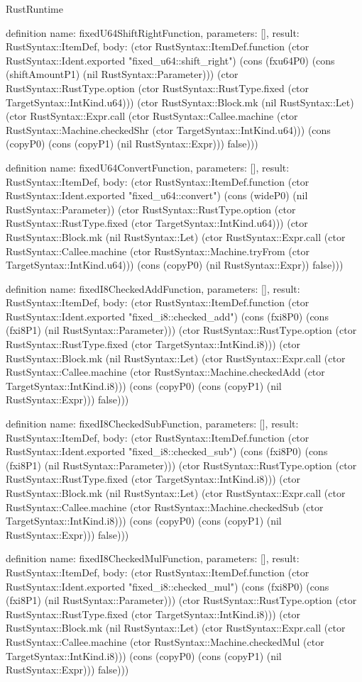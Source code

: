 \begin{lexlean}{RustRuntime}
\begin{semanticmodule}
definition{
  name: fixedU64ShiftRightFunction,
  parameters: [],
  result: RustSyntax::ItemDef,
  body: (ctor RustSyntax::ItemDef.function (ctor RustSyntax::Ident.exported "fixed_u64::shift_right") (cons (fxu64P0) (cons (shiftAmountP1) (nil RustSyntax::Parameter))) (ctor RustSyntax::RustType.option (ctor RustSyntax::RustType.fixed (ctor TargetSyntax::IntKind.u64))) (ctor RustSyntax::Block.mk (nil RustSyntax::Let) (ctor RustSyntax::Expr.call (ctor RustSyntax::Callee.machine (ctor RustSyntax::Machine.checkedShr (ctor TargetSyntax::IntKind.u64))) (cons (copyP0) (cons (copyP1) (nil RustSyntax::Expr))) false)))
}

definition{
  name: fixedU64ConvertFunction,
  parameters: [],
  result: RustSyntax::ItemDef,
  body: (ctor RustSyntax::ItemDef.function (ctor RustSyntax::Ident.exported "fixed_u64::convert") (cons (wideP0) (nil RustSyntax::Parameter)) (ctor RustSyntax::RustType.option (ctor RustSyntax::RustType.fixed (ctor TargetSyntax::IntKind.u64))) (ctor RustSyntax::Block.mk (nil RustSyntax::Let) (ctor RustSyntax::Expr.call (ctor RustSyntax::Callee.machine (ctor RustSyntax::Machine.tryFrom (ctor TargetSyntax::IntKind.u64))) (cons (copyP0) (nil RustSyntax::Expr)) false)))
}

definition{
  name: fixedI8CheckedAddFunction,
  parameters: [],
  result: RustSyntax::ItemDef,
  body: (ctor RustSyntax::ItemDef.function (ctor RustSyntax::Ident.exported "fixed_i8::checked_add") (cons (fxi8P0) (cons (fxi8P1) (nil RustSyntax::Parameter))) (ctor RustSyntax::RustType.option (ctor RustSyntax::RustType.fixed (ctor TargetSyntax::IntKind.i8))) (ctor RustSyntax::Block.mk (nil RustSyntax::Let) (ctor RustSyntax::Expr.call (ctor RustSyntax::Callee.machine (ctor RustSyntax::Machine.checkedAdd (ctor TargetSyntax::IntKind.i8))) (cons (copyP0) (cons (copyP1) (nil RustSyntax::Expr))) false)))
}

definition{
  name: fixedI8CheckedSubFunction,
  parameters: [],
  result: RustSyntax::ItemDef,
  body: (ctor RustSyntax::ItemDef.function (ctor RustSyntax::Ident.exported "fixed_i8::checked_sub") (cons (fxi8P0) (cons (fxi8P1) (nil RustSyntax::Parameter))) (ctor RustSyntax::RustType.option (ctor RustSyntax::RustType.fixed (ctor TargetSyntax::IntKind.i8))) (ctor RustSyntax::Block.mk (nil RustSyntax::Let) (ctor RustSyntax::Expr.call (ctor RustSyntax::Callee.machine (ctor RustSyntax::Machine.checkedSub (ctor TargetSyntax::IntKind.i8))) (cons (copyP0) (cons (copyP1) (nil RustSyntax::Expr))) false)))
}

definition{
  name: fixedI8CheckedMulFunction,
  parameters: [],
  result: RustSyntax::ItemDef,
  body: (ctor RustSyntax::ItemDef.function (ctor RustSyntax::Ident.exported "fixed_i8::checked_mul") (cons (fxi8P0) (cons (fxi8P1) (nil RustSyntax::Parameter))) (ctor RustSyntax::RustType.option (ctor RustSyntax::RustType.fixed (ctor TargetSyntax::IntKind.i8))) (ctor RustSyntax::Block.mk (nil RustSyntax::Let) (ctor RustSyntax::Expr.call (ctor RustSyntax::Callee.machine (ctor RustSyntax::Machine.checkedMul (ctor TargetSyntax::IntKind.i8))) (cons (copyP0) (cons (copyP1) (nil RustSyntax::Expr))) false)))
}


\end{semanticmodule}
\end{lexlean}
